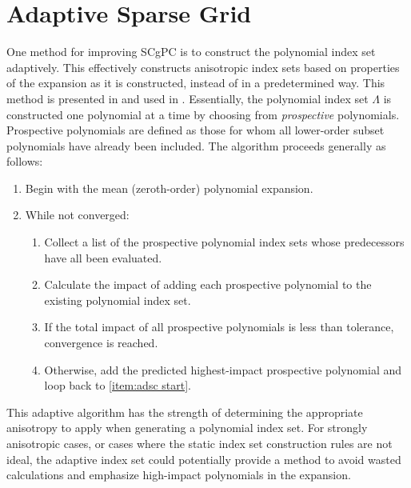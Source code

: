 \section{Adaptive Sparse Grid}\label{sec:adaptive sparse grid}
One method for improving SCgPC is to construct the polynomial index set adaptively.  This effectively
constructs anisotropic index sets based on properties of the expansion as it is constructed, instead of in a
predetermined way.  This method is presented in \cite{Gerstner} and used in \cite{Ayres}.  
Essentially, the polynomial index set $\Lambda$ is constructed one polynomial at a time by choosing from
\emph{prospective} polynomials.  Prospective polynomials are defined as those for whom all lower-order subset
polynomials have already been included.
The algorithm
proceeds generally as follows:
\begin{enumerate}
  \item Begin with the mean (zeroth-order) polynomial expansion.
  \item While not converged:
    \begin{enumerate}
      \item Collect a list of the prospective polynomial index sets whose predecessors have all been evaluated.
        \label{item:adsc start}
      \item Calculate the impact of adding each prospective polynomial to the existing polynomial index set.
        \label{item:calc impact}
      \item If the total impact of all prospective polynomials is less than tolerance, convergence is reached.
      \item Otherwise, add the predicted highest-impact prospective polynomial and loop back to \ref{item:adsc
        start}.
    \end{enumerate}
\end{enumerate}
This adaptive algorithm has the strength of determining the appropriate anisotropy to apply when generating a
polynomial index set.  For strongly  anisotropic cases, or cases where the static index set construction rules are not
ideal, the adaptive index set could potentially provide a method to avoid wasted calculations and emphasize
high-impact polynomials in the expansion.

